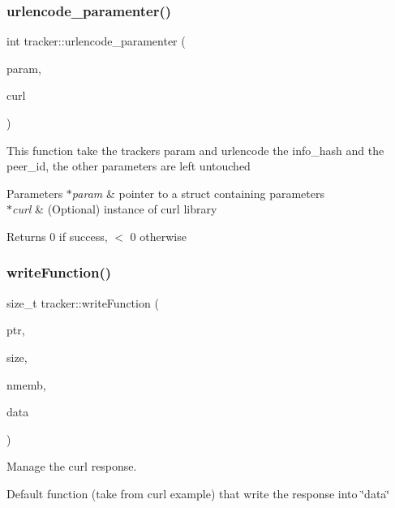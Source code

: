 \subsubsection{\texorpdfstring{urlencode\+\_\+paramenter()}{urlencode\_paramenter()}}
{\footnotesize\ttfamily int tracker\+::urlencode\+\_\+paramenter (\begin{DoxyParamCaption}\item[{\hyperlink{structtracker_1_1TParameter}{T\+Parameter} $\ast$}]{param,  }\item[{C\+U\+RL $\ast$}]{curl }\end{DoxyParamCaption})}

This function take the tracker\textquotesingle{}s param and urlencode the info\+\_\+hash and the peer\+\_\+id, the other parameters are left untouched


\begin{DoxyParams}{Parameters}
{\em $\ast$param} & pointer to a struct containing parameters \\
\hline
{\em $\ast$curl} & (Optional) instance of curl library\\
\hline
\end{DoxyParams}
\begin{DoxyReturn}{Returns}
0 if success, $<$ 0 otherwise 
\end{DoxyReturn}
\mbox{\label{namespacetracker_a6486613c238a5415481c5ae6234aa91b}} 
\subsubsection{\texorpdfstring{write\+Function()}{writeFunction()}}
{\footnotesize\ttfamily size\+\_\+t tracker\+::write\+Function (\begin{DoxyParamCaption}\item[{void $\ast$}]{ptr,  }\item[{size\+\_\+t}]{size,  }\item[{size\+\_\+t}]{nmemb,  }\item[{std\+::string $\ast$}]{data }\end{DoxyParamCaption})}



Manage the curl response. 

Default function (take from curl example) that write the response into \char`\"{}data\char`\"{} 